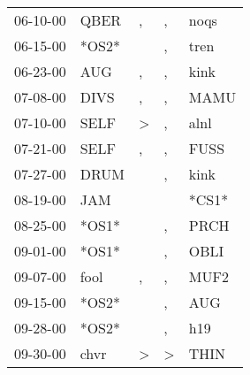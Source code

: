 \begin{supertabular}{p{0.07\textwidth}p{0.06\textwidth}p{0.02\textwidth}p{0.02\textwidth}p{0.06\textwidth}}
          06-10-00\textsuperscript{} &           QBER\textsuperscript{} &                , &                , &           noqs\textsuperscript{} \\
          06-15-00\textsuperscript{} &                            *OS2* &                  &                , &           tren\textsuperscript{} \\
          06-23-00\textsuperscript{} &            AUG\textsuperscript{} &                , &                , &           kink\textsuperscript{} \\
          07-08-00\textsuperscript{} &           DIVS\textsuperscript{} &                , &                , &           MAMU\textsuperscript{} \\
          07-10-00\textsuperscript{} &           SELF\textsuperscript{} &     \textgreater &                , &           alnl\textsuperscript{} \\
          07-21-00\textsuperscript{} &           SELF\textsuperscript{} &                , &                , &           FUSS\textsuperscript{} \\
          07-27-00\textsuperscript{} &           DRUM\textsuperscript{} &                  &                , &           kink\textsuperscript{} \\
          08-19-00\textsuperscript{} &            JAM\textsuperscript{} &                  &                  &                            *CS1* \\
          08-25-00\textsuperscript{} &                            *OS1* &                  &                , &           PRCH\textsuperscript{} \\
          09-01-00\textsuperscript{} &                            *OS1* &                  &                , &           OBLI\textsuperscript{} \\
          09-07-00\textsuperscript{} &           fool\textsuperscript{} &                , &                , &           MUF2\textsuperscript{} \\
          09-15-00\textsuperscript{} &                            *OS2* &                  &                , &            AUG\textsuperscript{} \\
          09-28-00\textsuperscript{} &                            *OS2* &                  &                , &            h19\textsuperscript{} \\
          09-30-00\textsuperscript{} &           chvr\textsuperscript{} &     \textgreater &     \textgreater &           THIN\textsuperscript{} \\

\end{supertabular}
